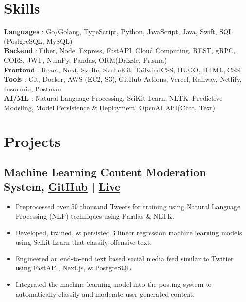 \documentclass[a4,10pt]{article}
\newenvironment{zitemize}{
\begin{itemize}\itemsep0pt \parskip0pt \parsep1pt}
{\end{itemize}\vspace{-0.5cm}}
\newcommand{\hskills}[1]{
\textbf{\bfseries #1} }
\begin{document}
\section{Skills}
\hskills{Languages}: {Go/Golang, TypeScript, Python, JavaScript,  Java, Swift, SQL (PostgreSQL, MySQL)}  \\
\hskills{Backend}: {Fiber, Node, Express, FastAPI, Cloud Computing, REST, gRPC, CORS, JWT, NumPy, Pandas, ORM(Drizzle, Prisma) }  \\
\hskills{Frontend}: {React, Next, Svelte, SvelteKit, TailwindCSS, HUGO, HTML, CSS} \\
\hskills{Tools}: {Git, Docker, AWS (EC2, S3), GitHub Actions, Vercel, Railway, Netlify, Insomnia, Postman} \\
\hskills{AI/ML}: {Natural Language Processing, SciKit-Learn, NLTK, Predictive Modeling, Model Persistence \& Deployment, OpenAI API(Chat, Text)}\\
\vspace{-0.2cm}







\section{Projects} 
\subsection*{Machine Learning Content Moderation System, {\normalsize \normalfont \href{https://github.com/xavierloeraflores/wgu-capstone}{GitHub}} | \normalsize \normalfont \href{https://wgu-capstone-xavier-loera-flores.vercel.app/}{Live} \hfill} 
\begin{zitemize}
       \item {Preprocessed over 50 thousand Tweets for training using Natural Language Processing (NLP) techniques using Pandas \& NLTK.} \\
       \item {Developed, trained, \& persisted 3 linear regression machine learning models using Scikit-Learn that classify offensive text. } \\
       \item {Engineered an end-to-end text based social media feed similar to Twitter using FastAPI, Next.js, \& PostgreSQL.} \\
        \item {Integrated the machine learning model into the posting system to automatically classify and moderate user generated content.} \\
       
     \end{zitemize}
\end{document}
